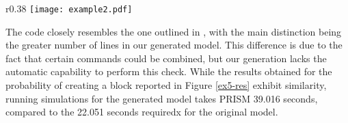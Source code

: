 \begin{comment}
   [NGRDF] (Network=0)  $\rightarrow$  
   	1 : (set2'=addBlockSet(set2,b2))$\&$(set3'=addBlockSet(set3,b3))$\&$(set4'=addBlockSet(set4,b4))$\&$(set5'=addBlockSet(set5,b5))$\&$(Network'=0); 
   [PCRLD] (Network=0)  $\rightarrow$  
   	1 : (set2'=addBlockSet(set2,b2))$\&$(set3'=addBlockSet(set3,b3))$\&$(set4'=addBlockSet(set4,b4))$\&$(set5'=addBlockSet(set5,b5))$\&$(Network'=0); 
   [MDDCF] (Network=0)  $\rightarrow$  1 : (set1' = removeBlock(set1,b1))$\&$(Network'=0); 
   [IQVPA] (Network=0)  $\rightarrow$  1 : (set1' = removeBlock(set1,b1))$\&$(Network'=0); 
   $\ldots$
endmodule

module Vote_Manager
   Vote_Manager : [0..1] init 0;
   epoch : [0..10] init 0;
   Votes : hash[];  
   tot_stake : [0..120000] init 50; 
   stake1 : [0..N] init 10; 
   stake2 : [0..N] init 10; 
   stake3 : [0..N] init 10; 
   stake4 : [0..N] init 10; 
   stake5 : [0..N] init 10; 

   [VSJBE] (Vote_Manager=0)  $\rightarrow$  
   	1 : (Votes'=addVote(Votes,b1,stake1))$\&$(Vote_Manager'=0); 
   $\ldots$
endmodule

\end{lstlisting}
\end{comment}

\begin{wrapfigure}{r}{0.38\textwidth}
	\vspace{-0.75cm}
	\centering
	\texttt{[image: example2.pdf]}	
	\vspace{-0.35cm}
	\caption{}
	\label{ex5-res}
	\vspace{-0.75cm}
	\end{wrapfigure}
The code closely resembles the one outlined in \cite{DBLP:journals/distribledger/GallettaLMV23}, with the main distinction being the greater number of lines in our generated model. 
This difference is due to the fact that certain commands could be combined, but our generation lacks the automatic capability to perform this check. While the results obtained for the probability of creating a block reported in Figure \ref{ex5-res} exhibit similarity, running simulations for the generated model takes PRISM 39.016 seconds, compared to the 22.051 seconds requiredx for the original model.


